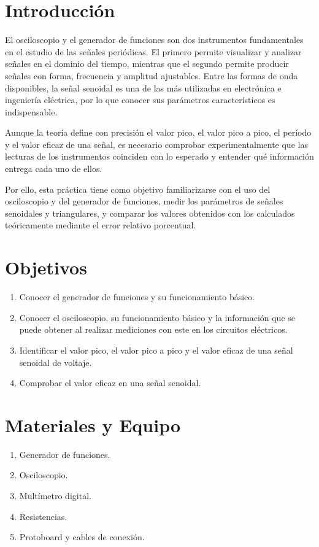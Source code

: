\documentclass{article}
\begin{document}
    \section{Introducción}

    El osciloscopio y el generador de funciones son dos instrumentos fundamentales en el estudio de las señales periódicas. El primero permite visualizar y analizar señales en el dominio del tiempo, mientras que el segundo permite producir señales con forma, frecuencia y amplitud ajustables. Entre las formas de onda disponibles, la señal senoidal es una de las más utilizadas en electrónica e ingeniería eléctrica, por lo que conocer sus parámetros característicos es indispensable.

    Aunque la teoría define con precisión el valor pico, el valor pico a pico, el período y el valor eficaz de una señal, es necesario comprobar experimentalmente que las lecturas de los instrumentos coinciden con lo esperado y entender qué información entrega cada uno de ellos.

    Por ello, esta práctica tiene como objetivo familiarizarse con el uso del osciloscopio y del generador de funciones, medir los parámetros de señales senoidales y triangulares, y comparar los valores obtenidos con los calculados teóricamente mediante el error relativo porcentual.

    \section{Objetivos}

    \begin{enumerate}
        \item Conocer el generador de funciones y su funcionamiento básico.
        \item Conocer el osciloscopio, su funcionamiento básico y la información que se puede obtener al realizar mediciones con este en los circuitos eléctricos.
        \item Identificar el valor pico, el valor pico a pico y el valor eficaz de una señal senoidal de voltaje.
        \item Comprobar el valor eficaz en una señal senoidal.
    \end{enumerate}

    \section{Materiales y Equipo}

    \begin{enumerate}
        \item Generador de funciones.
        \item Osciloscopio.
        \item Multímetro digital.
        \item Resistencias.
        \item Protoboard y cables de conexión.
    \end{enumerate}
\end{document}
